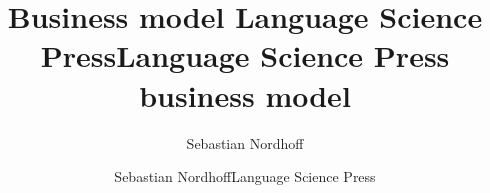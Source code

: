 \documentclass[nonflat,smallfont
]{langsci/langscibook}
\title{Business model Language Science Press}
\author{Sebastian Nordhoff}
\title{Language Science Press business model}
\author{Sebastian Nordhoff\newlineCover Language Science Press}
\begin{document}
% 
\newcommand{\background}[1]{ 
  \vspace{5mm}
  \renewcommand{\tblslinecolour}{lsDarkBlue}
  \tblssy[red]{explore2}{Background}{\vspace*{-5mm}#1}
}
\newcommand{\langscisolution}[1]{
  \renewcommand{\tblslinecolour}{lsLightBlue}
  \tblssy{langsci}{LangSci solution}{\vspace*{-5mm}#1}
}
\newcommand{\evaluation}[1]{
  \renewcommand{\tblslinecolour}{lsLightOrange}
  \tblssy{receipt}{Evaluation}{\vspace*{-5mm}#1}
}
\newcommand{\othersolutions}[1]{
  \renewcommand{\tblslinecolour}{lsDarkGreenOne}
  \tblssy{more}{Other solutions}{\vspace*{-5mm}#1}
}

\renewcommand{\tblssy}[4][black!12]{%
  \renewcommand{\langscisymbol}{#2}\renewcommand{\tblsboxcolor}{#1}
  \begin{mdframed}[style=yellowexercise,frametitle={#3}]
    #4
  \end{mdframed}
}
\end{document}

